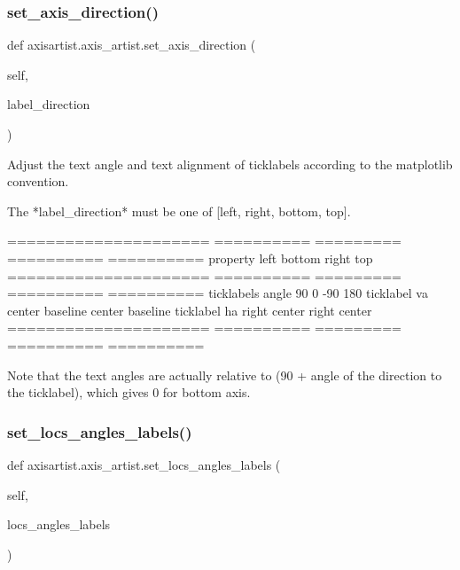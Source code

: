 \subsubsection{\texorpdfstring{set\+\_\+axis\+\_\+direction()}{set\_axis\_direction()}}
{\footnotesize\ttfamily def axisartist.\+axis\+\_\+artist.\+set\+\_\+axis\+\_\+direction (\begin{DoxyParamCaption}\item[{}]{self,  }\item[{}]{label\+\_\+direction }\end{DoxyParamCaption})}

\begin{DoxyVerb}Adjust the text angle and text alignment of ticklabels
according to the matplotlib convention.

The *label_direction* must be one of [left, right, bottom, top].

=====================    ========== ========= ========== ==========
property                 left       bottom    right      top
=====================    ========== ========= ========== ==========
ticklabels angle         90         0         -90        180
ticklabel va             center     baseline  center     baseline
ticklabel ha             right      center    right      center
=====================    ========== ========= ========== ==========

Note that the text angles are actually relative to (90 + angle
of the direction to the ticklabel), which gives 0 for bottom
axis.
\end{DoxyVerb}
 \mbox{\label{namespaceaxisartist_1_1axis__artist_ad360dcaf18e33e925cb4653b00eab87a}} 
\subsubsection{\texorpdfstring{set\+\_\+locs\+\_\+angles\+\_\+labels()}{set\_locs\_angles\_labels()}}
{\footnotesize\ttfamily def axisartist.\+axis\+\_\+artist.\+set\+\_\+locs\+\_\+angles\+\_\+labels (\begin{DoxyParamCaption}\item[{}]{self,  }\item[{}]{locs\+\_\+angles\+\_\+labels }\end{DoxyParamCaption})}



